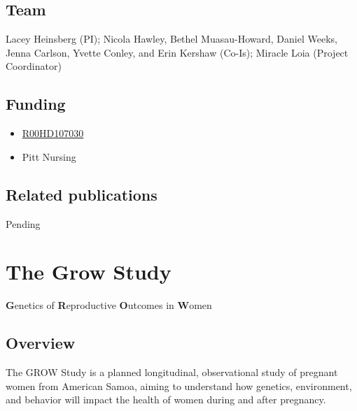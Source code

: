\documentclass[
  letterpaper,
  DIV=11,
  numbers=noendperiod]{scrreprt}
\providecommand{\tightlist}{%
  \setlength{\itemsep}{0pt}\setlength{\parskip}{0pt}}\usepackage{longtable,booktabs,array}
\begin{document}
\section*{Team}\label{team-1}


Lacey Heinsberg (PI); Nicola Hawley, Bethel Muasau-Howard, Daniel Weeks,
Jenna Carlson, Yvette Conley, and Erin Kershaw (Co-Is); Miracle Loia
(Project Coordinator)

\section*{Funding}\label{funding-1}


\begin{itemize}
\tightlist
\item
  \href{https://reporter.nih.gov/search/s9cX7Mg6vEiIAQOGIvCqog/project-details/11119329}{R00HD107030}
\item
  Pitt Nursing
\end{itemize}

\section*{Related publications}\label{related-publications-1}


Pending


\chapter*{The Grow Study}\label{the-grow-study}


\textbf{G}enetics of \textbf{R}eproductive \textbf{O}utcomes in
\textbf{W}omen

\section*{Overview}\label{overview-2}


The GROW Study is a planned longitudinal, observational study of
pregnant women from American Samoa, aiming to understand how genetics,
environment, and behavior will impact the health of women during and
after pregnancy.
\end{document}
